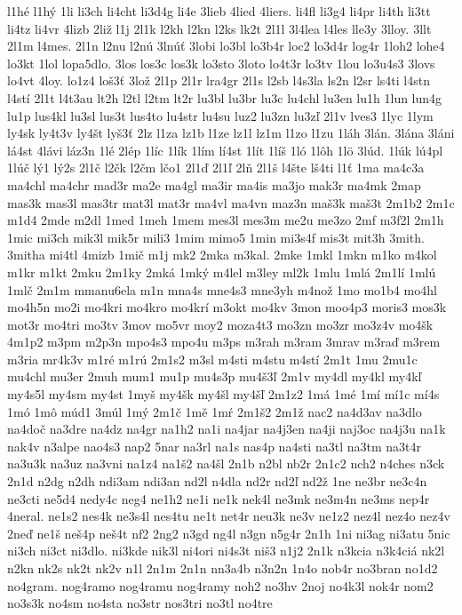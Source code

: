{l1hé
l1hý
1li
li3ch
li4cht
li3d4g
li4e
3lieb
4lied
4liers.
li4fl
li3g4
li4pr
li4th
li3tt
li4tz
li4vr
4lizb
2liž
l1j
2l1k
l2kh
l2kn
l2ks
lk2t
2l1l
3l4lea
l4les
lle3y
3lloy.
3llt
2l1m
l4mes.
2l1n
l2nu
l2nú
3lnúť
3lobi
lo3bl
lo3b4r
loc2
lo3d4r
log4r
1loh2
lohe4
lo3kt
1lol
lopa5dlo.
3los
los3c
los3k
lo3sto
3loto
lo4t3r
lo3tv
1lou
lo3u4s3
3lovs
lo4vt
4loy.
lo1z4
loš3ť
3lož
2l1p
2l1r
lra4gr
2l1s
l2sb
l4s3la
ls2n
l2sr
ls4ti
l4stn
l4stí
2l1t
l4t3au
lt2h
l2tl
l2tm
lt2r
lu3bl
lu3br
lu3c
lu4chl
lu3en
lu1h
1lun
lun4g
lu1p
lus4kl
lu3sl
lus3t
lus4to
lu4str
lu4su
luz2
lu3zn
lu3zľ
2l1v
lves3
1lyc
1lym
ly4sk
ly4t3v
ly4št
lyš3ť
2lz
l1za
lz1b
l1ze
lz1l
lz1m
l1zo
l1zu
1láh
3lán.
3lána
3láni
lá4st
4lávi
láz3n
1lé
2lép
1líc
1lík
1lím
lí4st
1lít
1líš
1ló
1lôh
1lö
3lúd.
1lúk
lú4pl
1lúč
lý1
lý2s
2l1č
l2čk
l2čm
lčo1
2l1ď
2l1ľ
2lň
2l1š
l4šte
lš4ti
l1ť
1ma
ma4c3a
ma4chl
ma4chr
mad3r
ma2e
ma4gl
ma3ir
ma4is
ma3jo
mak3r
ma4mk
2map
mas3k
mas3l
mas3tr
mat3l
mat3r
ma4vl
ma4vn
maz3n
maš3k
maš3t
2m1b2
2m1c
m1d4
2mde
m2dl
1med
1meh
1mem
mes3l
mes3m
me2u
me3zo
2mf
m3f2l
2m1h
1mic
mi3ch
mik3l
mik5r
mili3
1mim
mimo5
1min
mi3s4f
mis3t
mit3h
3mith.
3mitha
mi4tl
4mizb
1mič
m1j
mk2
2mka
m3kal.
2mke
1mkl
1mkn
m1ko
m4kol
m1kr
m1kt
2mku
2m1ky
2mká
1mký
m4lel
m3ley
ml2k
1mlu
1mlá
2m1lí
1mlú
1mlč
2m1m
mmanu6ela
m1n
mna4s
mne4s3
mne3yh
m4nož
1mo
mo1b4
mo4hl
mo4h5n
mo2i
mo4kri
mo4kro
mo4krí
m3okt
mo4kv
3mon
moo4p3
moris3
mos3k
mot3r
mo4tri
mo3tv
3mov
mo5vr
moy2
moza4t3
mo3zn
mo3zr
mo3z4v
mo4šk
4m1p2
m3pm
m2p3n
mpo4s3
mpo4u
m3ps
m3rah
m3ram
3mrav
m3raď
m3rem
m3ria
mr4k3v
m1ré
m1rú
2m1s2
m3sl
m4sti
m4stu
m4stí
2m1t
1mu
2mu1c
mu4chl
mu3er
2muh
mum1
mu1p
mu4s3p
mu4š3ľ
2m1v
my4dl
my4kl
my4kľ
my4s5l
my4sm
my4st
1myš
my4šk
my4šl
my4šľ
2m1z2
1má
1mé
1mí
mí1c
mí4s
1mó
1mô
múd1
3múl
1mý
2m1č
1mě
1mŕ
2m1š2
2m1ž
nac2
na4d3av
na3dlo
na4doč
na3dre
na4dz
na4gr
na1h2
na1i
na4jar
na4j3en
na4ji
naj3oc
na4j3u
na1k
nak4v
n3alpe
nao4s3
nap2
5nar
na3rl
na1s
nas4p
na4sti
na3tl
na3tm
na3t4r
na3u3k
na3uz
na3vni
na1z4
na1š2
na4šl
2n1b
n2bl
nb2r
2n1c2
nch2
n4ches
n3ck
2n1d
n2dg
n2dh
ndi3am
ndi3an
nd2l
n4dla
nd2r
nd2ľ
nd2ž
1ne
ne3br
ne3c4n
ne3cti
ne5d4
nedy4c
neg4
ne1h2
ne1i
ne1k
nek4l
ne3mk
ne3m4n
ne3ms
nep4r
4neral.
ne1s2
nes4k
ne3s4l
nes4tu
ne1t
net4r
neu3k
ne3v
ne1z2
nez4l
nez4o
nez4v
2neď
ne1š
neš4p
neš4t
nf2
2ng2
n3gd
ng4l
n3gn
n5g4r
2n1h
1ni
ni3ag
ni3atu
5nic
ni3ch
ni3ct
ni3dlo.
ni3kde
nik3l
ni4ori
ni4s3t
niš3
n1j2
2n1k
n3kcia
n3k4ciá
nk2l
n2kn
nk2s
nk2t
nk2v
n1l
2n1m
2n1n
nn3a4b
n3n2n
1n4o
nob4r
no3bran
no1d2
no4gram.
nog4ramo
nog4ramu
nog4ramy
noh2
no3hv
2noj
no4k3l
nok4r
nom2
no3s3k
no4sm
no4sta
no3str
nos3tri
no3tl
no4tre
}
